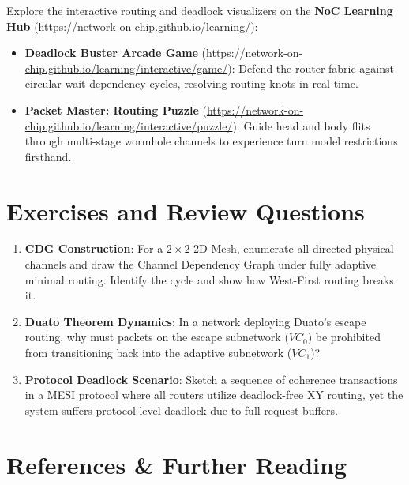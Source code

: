 Explore the interactive routing and deadlock visualizers on the \textbf{NoC Learning Hub} (\url{https://network-on-chip.github.io/learning/}):
\begin{itemize}
    \item \textbf{Deadlock Buster Arcade Game} (\url{https://network-on-chip.github.io/learning/interactive/game/}): Defend the router fabric against circular wait dependency cycles, resolving routing knots in real time.
    \item \textbf{Packet Master: Routing Puzzle} (\url{https://network-on-chip.github.io/learning/interactive/puzzle/}): Guide head and body flits through multi-stage wormhole channels to experience turn model restrictions firsthand.
\end{itemize}

\section{Exercises and Review Questions}
\label{sec:ch5_exercises}

\begin{enumerate}
    \item \textbf{CDG Construction}: For a $2 \times 2$ 2D Mesh, enumerate all directed physical channels and draw the Channel Dependency Graph under fully adaptive minimal routing. Identify the cycle and show how West-First routing breaks it.
    \item \textbf{Duato Theorem Dynamics}: In a network deploying Duato's escape routing, why must packets on the escape subnetwork ($VC_0$) be prohibited from transitioning back into the adaptive subnetwork ($VC_1$)?
    \item \textbf{Protocol Deadlock Scenario}: Sketch a sequence of coherence transactions in a MESI protocol where all routers utilize deadlock-free XY routing, yet the system suffers protocol-level deadlock due to full request buffers.
\end{enumerate}

\section{References \& Further Reading}
\label{sec:ch5_references}

